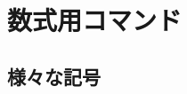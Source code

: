 \documentclass[11pt,a4paper,oneside,lualatex]{ltjsarticle} %
\numberwithin{equation}{section} %
\begin{document}

\section{数式用コマンド} \label{sec:eq}



\subsection{様々な記号} \label{subsec:symbols}

\end{document}
